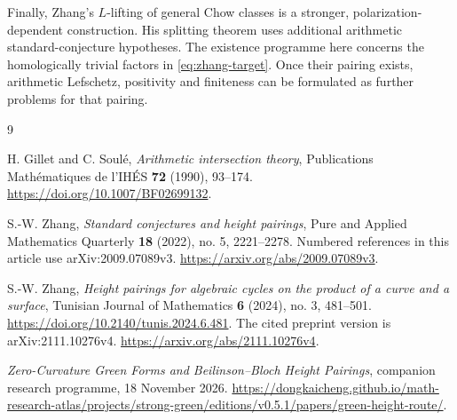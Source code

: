 \documentclass[11pt,a4paper]{article}
\theoremstyle{definition}
\numberwithin{equation}{section}
\begin{document}
Finally, Zhang's $L$-lifting of general Chow classes is a stronger, polarization-dependent construction. His splitting theorem \cite[Theorem 2.2.1]{ZhangStandard} uses additional arithmetic standard-conjecture hypotheses. The existence programme here concerns the homologically trivial factors in \eqref{eq:zhang-target}. Once their pairing exists, arithmetic Lefschetz, positivity and finiteness can be formulated as further problems for that pairing.

\begin{thebibliography}{9}

H. Gillet and C. Soul\'e,
\emph{Arithmetic intersection theory},
Publications Math\'ematiques de l'IH\'ES \textbf{72} (1990), 93--174.
\url{https://doi.org/10.1007/BF02699132}.

S.-W. Zhang,
\emph{Standard conjectures and height pairings},
Pure and Applied Mathematics Quarterly \textbf{18} (2022), no. 5, 2221--2278.
Numbered references in this article use arXiv:2009.07089v3.
\url{https://arxiv.org/abs/2009.07089v3}.

S.-W. Zhang,
\emph{Height pairings for algebraic cycles on the product of a curve and a surface},
Tunisian Journal of Mathematics \textbf{6} (2024), no. 3, 481--501.
\url{https://doi.org/10.2140/tunis.2024.6.481}.
The cited preprint version is arXiv:2111.10276v4.
\url{https://arxiv.org/abs/2111.10276v4}.

\emph{Zero-Curvature Green Forms and Beilinson--Bloch Height Pairings},
companion research programme, 18 November 2026.
\url{https://dongkaicheng.github.io/math-research-atlas/projects/strong-green/editions/v0.5.1/papers/green-height-route/}.

\end{thebibliography}
\end{document}
